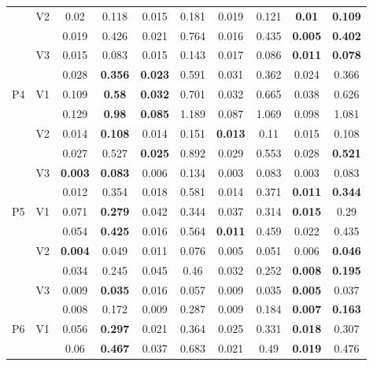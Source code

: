\documentclass[12pt,a4paper]{article}
\begin{document}
\begin{sidewaystable}[ht]
{\begin{tabular}{cc|cc|cc|cc|cc|}
   & \multirow{2}{*}{V2} & 0.02 & 0.118 & 0.015 & 0.181 & 0.019 & 0.121 & \textbf{0.01} & \textbf{0.109} \\ 
   &  & 0.019 & 0.426 & 0.021 & 0.764 & 0.016 & 0.435 & \textbf{0.005} & \textbf{0.402} \\ 
   & \multirow{2}{*}{V3} & 0.015 & 0.083 & 0.015 & 0.143 & 0.017 & 0.086 & \textbf{0.011} & \textbf{0.078} \\ 
   &  & 0.028 & \textbf{0.356} & \textbf{0.023} & 0.591 & 0.031 & 0.362 & 0.024 & 0.366 \\ 
   \hline \hline\multirow{6}{*}{P4} & \multirow{2}{*}{V1} & 0.109 & \textbf{0.58} & \textbf{0.032} & 0.701 & 0.032 & 0.665 & 0.038 & 0.626 \\ 
   &  & 0.129 & \textbf{0.98} & \textbf{0.085} & 1.189 & 0.087 & 1.069 & 0.098 & 1.081 \\ 
   & \multirow{2}{*}{V2} & 0.014 & \textbf{0.108} & 0.014 & 0.151 & \textbf{0.013} & 0.11 & 0.015 & 0.108 \\ 
   &  & 0.027 & 0.527 & \textbf{0.025} & 0.892 & 0.029 & 0.553 & 0.028 & \textbf{0.521} \\ 
   & \multirow{2}{*}{V3} & \textbf{0.003} & \textbf{0.083} & 0.006 & 0.134 & 0.003 & 0.083 & 0.003 & 0.083 \\ 
   &  & 0.012 & 0.354 & 0.018 & 0.581 & 0.014 & 0.371 & \textbf{0.011} & \textbf{0.344} \\ 
   \hline \hline\multirow{6}{*}{P5} & \multirow{2}{*}{V1} & 0.071 & \textbf{0.279} & 0.042 & 0.344 & 0.037 & 0.314 & \textbf{0.015} & 0.29 \\ 
   &  & 0.054 & \textbf{0.425} & 0.016 & 0.564 & \textbf{0.011} & 0.459 & 0.022 & 0.435 \\ 
   & \multirow{2}{*}{V2} & \textbf{0.004} & 0.049 & 0.011 & 0.076 & 0.005 & 0.051 & 0.006 & \textbf{0.046} \\ 
   &  & 0.034 & 0.245 & 0.045 & 0.46 & 0.032 & 0.252 & \textbf{0.008} & \textbf{0.195} \\ 
   & \multirow{2}{*}{V3} & 0.009 & \textbf{0.035} & 0.016 & 0.057 & 0.009 & 0.035 & \textbf{0.005} & 0.037 \\ 
   &  & 0.008 & 0.172 & 0.009 & 0.287 & 0.009 & 0.184 & \textbf{0.007} & \textbf{0.163} \\ 
   \hline \hline\multirow{6}{*}{P6} & \multirow{2}{*}{V1} & 0.056 & \textbf{0.297} & 0.021 & 0.364 & 0.025 & 0.331 & \textbf{0.018} & 0.307 \\ 
   &  & 0.06 & \textbf{0.467} & 0.037 & 0.683 & 0.021 & 0.49 & \textbf{0.019} & 0.476 \\ 

\end{tabular}}
\end{sidewaystable}
\end{document}
